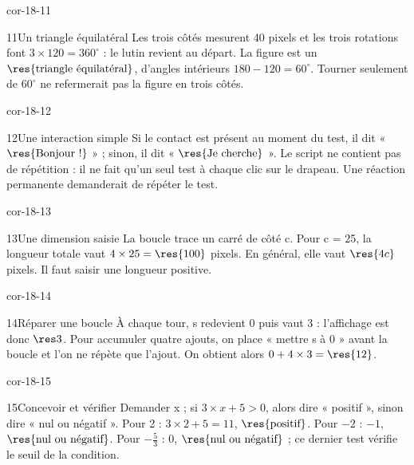 \begin{blocLivre}{cor-18-11}\begin{corrige}{11}{Un triangle équilatéral}
Les trois côtés mesurent 40 pixels et les trois rotations font $3\times120=360^\circ$ : le lutin revient au départ. La figure est un $\res{\text{triangle équilatéral}}$, d’angles intérieurs $180-120=60^\circ$. Tourner seulement de $60^\circ$ ne refermerait pas la figure en trois côtés.
\label{fig-cor-18-11}
\end{corrige}\end{blocLivre}
\begin{blocLivre}{cor-18-12}\begin{corrige}{12}{Une interaction simple}
Si le contact est présent au moment du test, il dit « $\res{\text{Bonjour !}}$ » ; sinon, il dit « $\res{\text{Je cherche}}$ ». Le script ne contient pas de répétition : il ne fait qu’un seul test à chaque clic sur le drapeau. Une réaction permanente demanderait de répéter le test.
\label{fig-cor-18-12}
\end{corrige}\end{blocLivre}
\begin{blocLivre}{cor-18-13}\begin{corrige}{13}{Une dimension saisie}
La boucle trace un carré de côté c. Pour c = 25, la longueur totale vaut $4\times25=\res{100}$ pixels. En général, elle vaut $\res{4c}$ pixels. Il faut saisir une longueur positive.
\label{fig-cor-18-13}
\end{corrige}\end{blocLivre}
\begin{blocLivre}{cor-18-14}\begin{corrige}{14}{Réparer une boucle}
À chaque tour, s redevient 0 puis vaut 3 : l’affichage est donc $\res3$. Pour accumuler quatre ajouts, on place « mettre s à 0 » avant la boucle et l’on ne répète que l’ajout. On obtient alors $0+4\times3=\res{12}$.
\label{fig-cor-18-14}
\end{corrige}\end{blocLivre}
\begin{blocLivre}{cor-18-15}\begin{corrige}{15}{Concevoir et vérifier}
Demander x ; si $3\times x+5>0$, alors dire « positif », sinon dire « nul ou négatif ». Pour 2 : $3\times2+5=11$, $\res{\text{positif}}$. Pour $-2$ : $-1$, $\res{\text{nul ou négatif}}$. Pour $-\frac53$ : 0, $\res{\text{nul ou négatif}}$ ; ce dernier test vérifie le seuil de la condition.
\label{fig-cor-18-15}
\end{corrige}\end{blocLivre}
